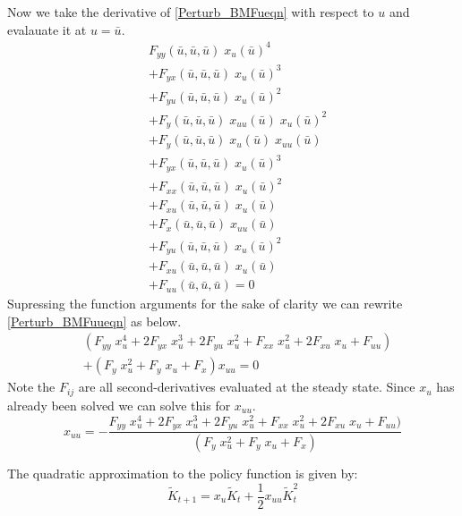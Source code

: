 \documentclass[letterpaper,12pt]{article}
\theoremstyle{definition}
\begin{document}
\begin{spacing}{1.5}
	Now we take the derivative of \eqref{Perturb_BMFueqn} with respect to $u$ and evalauate it at $u=\bar u$.
	\begin{equation} \begin{split}
		& F_{yy}(\bar u,\bar u,\bar u)\; x_u(\bar u)^4 \\
		& + F_{yx}(\bar u,\bar u,\bar u)\; x_u(\bar u)^3 \\
		& + F_{yu}(\bar u,\bar u,\bar u)\; x_u(\bar u)^2 \\
		& + F_y(\bar u,\bar u,\bar u)\; x_{uu}(\bar u)\; x_u(\bar u)^2 \\
		& + F_y(\bar u,\bar u,\bar u)\; x_u(\bar u)\; x_{uu}(\bar u) \\
		& + F_{yx}(\bar u,\bar u,\bar u)\; x_u(\bar u)^3 \\
		& + F_{xx}(\bar u,\bar u,\bar u)\; x_u(\bar u)^2 \\
		& + F_{xu}(\bar u,\bar u,\bar u)\; x_u(\bar u) \\
		& + F_x(\bar u,\bar u,\bar u)\; x_{uu}(\bar u) \\
		& + F_{yu}(\bar u,\bar u,\bar u)\; x_u(\bar u)^2 \\
		& + F_{xu}(\bar u,\bar u,\bar u)\; x_u(\bar u) \\
		& + F_{uu}(\bar u,\bar u,\bar u) = 0 \label{Perturb_BMFuueqn}
	\end{split} \end{equation}
	Supressing the function arguments for the sake of clarity we can rewrite \eqref{Perturb_BMFuueqn} as below.
	\begin{equation} \begin{split}
		& (F_{yy}\; x_u^4 + 2F_{yx}\; x_u^3 + 2F_{yu}\; x_u^2 + F_{xx}\; x_u^2 + 2F_{xu}\; x_u + F_{uu}) \\
		& + (F_y\; x_u^2 + F_y\; x_u + F_x) x_{uu} = 0 \nonumber
	\end{split} \end{equation}
	Note the $F_{ij}$ are all second-derivatives evaluated at the steady state. Since $x_u$ has already been solved we can solve this for $x_{uu}$.  
	\begin{equation}
		x_{uu} = - \frac{F_{yy}\; x_u^4 + 2F_{yx}\; x_u^3 + 2F_{yu}\; x_u^2 + F_{xx}\; x_u^2 + 2F_{xu}\; x_u + F_{uu})}{(F_y\; x_u^2 + F_y\; x_u + F_x)} \label{Perturb_BMxuueqn}
	\end{equation}

	The quadratic approximation to the policy function is given by:
	\begin{equation}
		\tilde K_{t+1} = x_u \tilde K_t + \frac{1}{2} x_{uu} {\tilde K}_t^2
	\end{equation}


\end{spacing}
\end{document}
